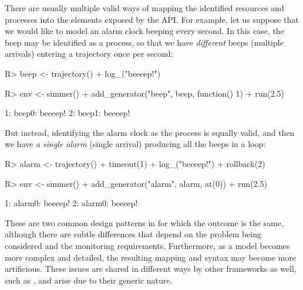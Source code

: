 \documentclass[
  nojss]{jss}
\begin{document}
There are usually multiple valid ways of mapping the identified
resources and processes into the elements exposed by the 
API. For example, let us suppose that we would like to model an alarm
clock beeping every second. In this case, the beep may be identified as
a process, so that we have \emph{different} beeps (multiple arrivals)
entering a  trajectory once per second:

\begin{CodeChunk}
\begin{CodeInput}
R> beep <- trajectory() %
+   log_("beeeep!")
\end{CodeInput}
\end{CodeChunk}

\begin{CodeChunk}
\begin{CodeInput}
R> env <- simmer() %
+   add_generator("beep", beep, function() 1) %
+   run(2.5)
\end{CodeInput}
\begin{CodeOutput}
1: beep0: beeeep!
2: beep1: beeeep!
\end{CodeOutput}
\end{CodeChunk}

But instead, identifying the alarm clock as the process is equally
valid, and then we have \emph{a single alarm} (single arrival) producing
all the beeps in a loop:

\begin{CodeChunk}
\begin{CodeInput}
R> alarm <- trajectory() %
+   timeout(1) %
+   log_("beeeep!") %
+   rollback(2)
\end{CodeInput}
\end{CodeChunk}

\begin{CodeChunk}
\begin{CodeInput}
R> env <- simmer() %
+   add_generator("alarm", alarm, at(0)) %
+   run(2.5)
\end{CodeInput}
\begin{CodeOutput}
1: alarm0: beeeep!
2: alarm0: beeeep!
\end{CodeOutput}
\end{CodeChunk}

These are two common design patterns in  for which the
outcome is the same, although there are subtle differences that depend
on the problem being considered and the monitoring requirements.
Furthermore, as a model becomes more complex and detailed, the resulting
mapping and syntax may become more artificious. These issues are shared
in different ways by other frameworks as well, such as , and
arise due to their generic nature.
\end{document}
